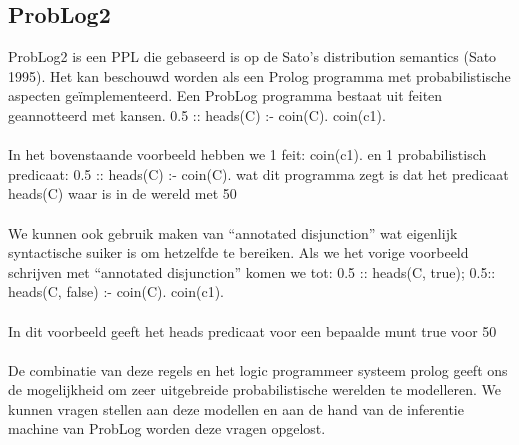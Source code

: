 \documentclass[12pt,a4paper,oneside]{book}
\theoremstyle{definition}
\begin{document}
\subsection{ProbLog2}
ProbLog2 is een PPL die gebaseerd is op de Sato’s distribution semantics (Sato 1995). Het kan beschouwd worden als een Prolog programma met probabilistische aspecten geïmplementeerd. Een ProbLog programma bestaat uit feiten geannotteerd met kansen.
0.5 :: heads(C) :- coin(C).
coin(c1).
\\\\
In het bovenstaande voorbeeld hebben we 1 feit: coin(c1). en 1 probabilistisch predicaat: 0.5 :: heads(C) :- coin(C). wat dit programma zegt is dat het predicaat heads(C) waar is in de wereld met 50%
\\\\
We kunnen ook gebruik maken van “annotated disjunction” wat eigenlijk syntactische suiker is om hetzelfde te bereiken. Als we het vorige voorbeeld schrijven met “annotated disjunction” komen we tot:
0.5 :: heads(C, true); 0.5:: heads(C, false) :- coin(C).
coin(c1).
\\\\
In dit voorbeeld geeft het heads predicaat voor een bepaalde munt true voor 50%
\\\\
De combinatie van deze regels en het logic programmeer systeem prolog geeft ons de mogelijkheid om zeer uitgebreide probabilistische werelden te modelleren. We kunnen vragen stellen aan deze modellen en aan de hand van de inferentie machine van ProbLog worden deze vragen opgelost.
\end{document}

